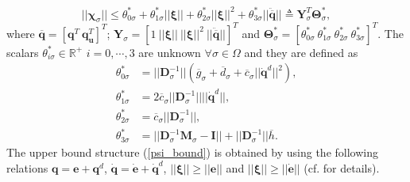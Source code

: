 \begin{equation}
|| \boldsymbol \chi_{\sigma}||\leq \theta_{0 \sigma}^{*} + \theta_{1 \sigma}^{*}  ||  \boldsymbol{ \xi} ||+ \theta_{2\sigma}^{*}  ||  \boldsymbol{ \xi} ||^2+ \theta_{3\sigma}^{*}  ||  \ddot{\overline{\mathbf{ q}}} ||\triangleq \mathbf{Y}_{\sigma}^T \boldsymbol \Theta_{\sigma}^{*} , \label{psi_bound} 
\end{equation}
where $\overline{\mathbf{q}}=[\mathbf{q}^T~\mathbf{q}_{\mathbf u}^T]^T$; $\mathbf{Y}_{\sigma}=[1~||  \boldsymbol{ \xi} ||~ ||  \boldsymbol{ \xi} ||^2~||\ddot{\overline{\mathbf q}}||]^T $ and $\boldsymbol \Theta_{\sigma}^{*}=[\theta_{0\sigma}^{*} ~\theta_{1\sigma}^{*} ~\theta_{2\sigma}^{*}~ \theta_{3 \sigma}^{*}]^T$. The scalars $\theta_{i \sigma}^{*} \in \mathbb{R}^{+}$ $i=0,\cdots,3$ are unknown $\forall \sigma \in \Omega$ and they are defined as 
\begin{align*}
\theta_{0 \sigma}^{*} &= || \mathbf D_\sigma^{-1} || (\overline{g}_\sigma+\overline{d}_\sigma + \overline{c}_\sigma || \dot{\mathbf{q}}^d ||^2), \\
\theta_{1 \sigma}^{*} &= 2  \overline{c}_\sigma || \mathbf D_\sigma^{-1} |||| \dot{\mathbf{q}}^d ||,\\
\theta_{2 \sigma}^{*} &= \overline{c}_\sigma || \mathbf D_\sigma^{-1} ||,  \\
\theta_{3 \sigma}^{*} &= || \mathbf D_\sigma^{-1} \mathbf{M}_\sigma - \mathbf{I} || +  || \mathbf D_\sigma^{-1} || \overline{h}.
\end{align*}
The upper bound structure (\ref{psi_bound}) is obtained by using the following relations $\mathbf{q}=\mathbf{e}+\mathbf{q}^d$, $\dot{\mathbf{q}}=\dot{\mathbf{e}}+\dot{\mathbf{q}}^d$, $||\boldsymbol \xi || \geq || \mathbf{e} ||$ and $||\boldsymbol \xi || \geq || \dot{\mathbf{e}} ||$ (cf. \cite{roy2019adaptive,roy2020adaptive} for details). %

